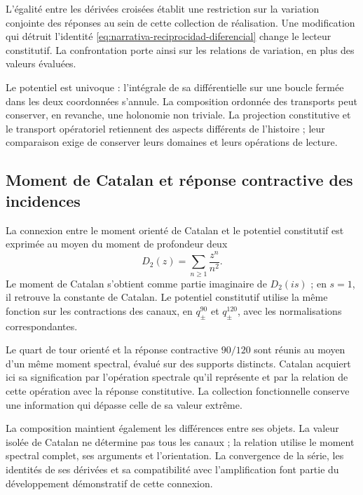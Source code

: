 L’égalité entre les dérivées croisées établit une restriction
sur la variation conjointe des réponses au sein de cette collection
de réalisation. Une modification qui détruit l’identité
\eqref{eq:narrativa-reciprocidad-diferencial} change le lecteur
constitutif. La confrontation porte ainsi sur les relations de variation,
en plus des valeurs évaluées.

Le potentiel est univoque : l’intégrale de sa différentielle sur
une boucle fermée dans les deux coordonnées s’annule. La composition
ordonnée des transports peut conserver, en revanche, une holonomie
non triviale. La projection constitutive et le transport opératoriel
retiennent des aspects différents de l’histoire ; leur comparaison exige de
conserver leurs domaines et leurs opérations de lecture.

\subsection{Moment de Catalan et réponse contractive des incidences}
\label{subsec:narrativa-catalan-potencial}

La connexion entre le moment orienté de Catalan et le potentiel
constitutif est exprimée au moyen du moment de profondeur deux
\begin{equation}
 D_2(z)=\sum_{n\geq1}\frac{z^n}{n^2}.
 \label{eq:narrativa-momento-dos}
\end{equation}
Le moment de Catalan s’obtient comme partie imaginaire de
$D_2(is)$ ; en $s=1$, il retrouve la constante de Catalan. Le potentiel
constitutif utilise la même fonction sur les contractions des
canaux, en $q_\pm^{90}$ et $q_\pm^{120}$, avec les normalisations
correspondantes.

Le quart de tour orienté et la réponse contractive $90/120$
sont réunis au moyen d’un même moment spectral, évalué sur des
supports distincts. Catalan acquiert ici sa signification par
l’opération spectrale qu’il représente et par la relation de cette
opération avec la réponse constitutive. La collection fonctionnelle
conserve une information qui dépasse celle de sa valeur extrême.

La composition maintient également les différences entre ses objets.
La valeur isolée de Catalan ne détermine pas tous les canaux ;
la relation utilise le moment spectral complet, ses arguments
et l’orientation. La convergence de la série, les identités
de ses dérivées et sa compatibilité avec l’amplification font
partie du développement démonstratif de cette connexion.

